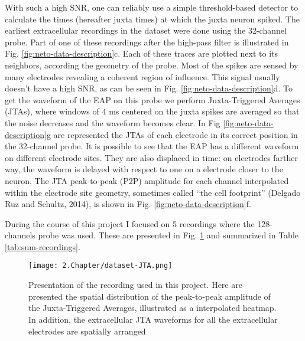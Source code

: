 With such a high SNR, one can reliably use a simple threshold-based detector to calculate the times (hereafter juxta times) at which the juxta neuron spiked. The earliest extracellular recordings in the dataset were done using the 32-channel probe. Part of one of these recordings after the high-pass filter is illustrated in Fig. \ref{fig:neto-data-description}c.  Each of these traces are plotted next to its neighbors, according the geometry of the probe. Most of the spikes are sensed by many electrodes revealing a coherent region of influence. This signal usually doesn't have a high SNR, as can be seen in Fig. \ref{fig:neto-data-description}d. To get the waveform of the EAP on this probe we perform Juxta-Triggered Averages (JTAs), where windows of 4 ms centered on the juxta spikes are averaged so that the noise decreases and the waveform becomes clear. In Fig \ref{fig:neto-data-description}g are represented the JTAs of each electrode in its correct position in the 32-channel probe. It is possible to see that the EAP has a different waveform on different electrode sites. They are also displaced in time: on electrodes farther way, the waveform is delayed with respect to one on a electrode closer to the neuron. The JTA peak-to-peak (P2P) amplitude for each channel interpolated within the electrode site geometry, sometimes called “the cell footprint” (Delgado Ruz and Schultz, 2014), is shown in Fig. \ref{fig:neto-data-description}f.

During the course of this project I focused on 5 recordings where the 128-channels probe was used. These are presented in Fig. \ref{fig:recordings-summary} and summarized in Table \ref{tab:sum-recordings}.

\begin{figure}[!h]
	\centering
	\texttt{[image: 2.Chapter/dataset-JTA.png]}
	\caption{Presentation of the recording used in this project. Here are presented the spatial distribution of the peak-to-peak amplitude of the Juxta-Triggered Averages, illustrated as a interpolated heatmap. In addition, the extracellular JTA waveforms for all the extracellular electrodes are spatially arranged
}
\label{fig:recordings-summary}
\end{figure}


